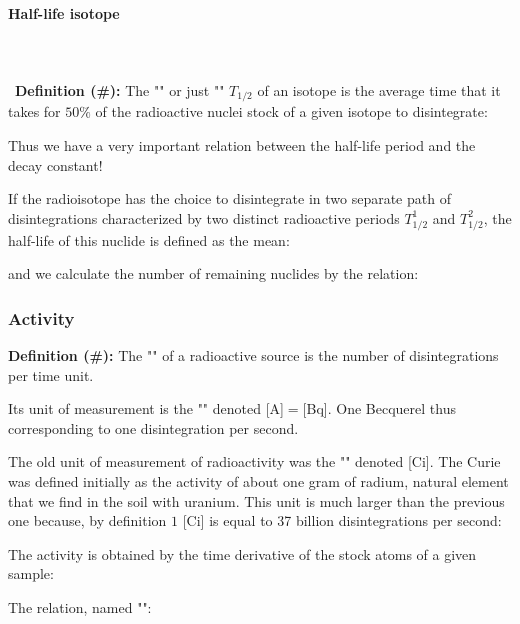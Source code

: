 	\paragraph{Half-life isotope}\mbox{}\\\\\
	\textbf{Definition (\#\mydef):} The "" or just "" $T_{1/2}$ of an isotope is the average time that it takes for $50\%$ of the radioactive nuclei stock of a given isotope to disintegrate:
	
	Thus we have a very important relation between the half-life period and the decay constant!

	If the radioisotope has the choice to disintegrate in two separate path of disintegrations characterized by two distinct radioactive periods $T_{1/2}^1$ and $T_{1/2}^2$, the half-life of this nuclide is defined as the mean:
	
	and we calculate the number of remaining nuclides by the relation:
	
	
	\pagebreak
	\subsubsection{Activity}
	\textbf{Definition (\#\mydef):} The "" of a radioactive source is the number of disintegrations per time unit.
	\begin{tcolorbox}[title=Remark,colframe=black,arc=10pt]
	Its unit of measurement is the "" denoted [A]$=$[Bq]. One Becquerel thus corresponding to one disintegration per second.
	\end{tcolorbox}
	The old unit of measurement of radioactivity was the "" denoted [Ci]. The Curie was defined initially as the activity of about one gram of radium, natural element that we find in the soil with uranium. This unit is much larger than the previous one because, by definition $1$ [Ci] is equal to 37 billion disintegrations per second:
	
	The activity is obtained by the time derivative of the stock atoms of a given sample:
	
	The relation, named "":
	
